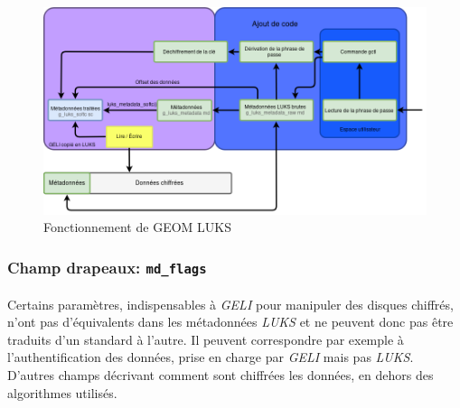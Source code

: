 \begin{figure}[h]
\centering
\includegraphics[width=\linewidth]{choix_developpement/utilisation_metadonnee_luks_2.png}
\caption{\label{fig:fonctionnement}Fonctionnement de GEOM LUKS}
\end{figure}

\subsubsection{Champ drapeaux: \texttt{md\_flags}}
\paragraph{}
Certains paramètres, indispensables à \textit{GELI} pour manipuler des disques
chiffrés, n'ont pas d'équivalents dans les métadonnées \textit{LUKS} et ne
peuvent donc pas être traduits d'un standard à l'autre. Il peuvent correspondre
par exemple à l'authentification des données, prise en charge par \textit{GELI}
mais pas \textit{LUKS}. D'autres champs décrivant comment sont chiffrées les
données, en dehors des algorithmes utilisés.

